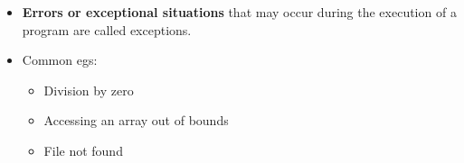 \setlength{\columnsep}{3pt}
\begin{flushleft}

	\begin{itemize}
		\item \textbf{Errors or exceptional situations} that may occur during the execution of a program are called exceptions.
		\item Common egs:
		\begin{itemize}
			\item Division by zero
			\item Accessing an array out of bounds
			\item File not found
		\end{itemize}
	\end{itemize}
	
\end{flushleft}


